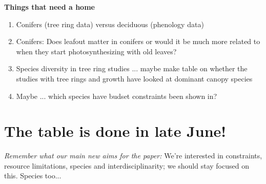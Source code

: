 \documentclass[11pt,letter]{article}
\begin{document}
{\bf Things that need a home}
\begin{enumerate}
\item Conifers (tree ring data) versus deciduous (phenology data)
\item Conifers: Does leafout matter in conifers or would it be much more related to when they start photosynthesizing with old leaves?
\item Species diversity in tree ring studies ... maybe make table on whether the studies with tree rings and growth have looked at dominant canopy species 
\item Maybe ... which species have budset constraints been shown in?
\end{enumerate}


\newpage
\section{The table is done in late June!}

\emph{Remember what our main new aims for the paper:}
We're interested in constraints, resource limitations, species and interdisciplinarity; we should stay focused on this. Species too... 
\end{document}
